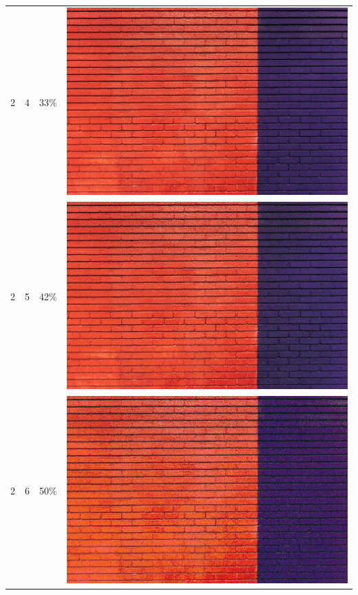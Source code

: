 \documentclass[times, utf8, seminar]{fer}
\begin{document}
\begin{center}
\begin{longtable}{|c|c|c|c|}
2 & 4 &33\% & \includegraphics[scale=0.3]{../benchmark_results/pattern/2_components-4_bits.png} \\
2 & 5 &42\% & \includegraphics[scale=0.3]{../benchmark_results/pattern/2_components-5_bits.png} \\
2 & 6 &50\% & \includegraphics[scale=0.3]{../benchmark_results/pattern/2_components-6_bits.png} \\

\end{longtable}
\end{center}
\end{document}
